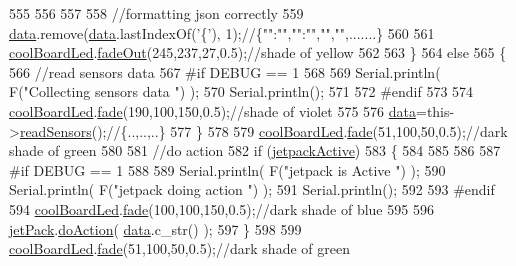 \begin{DoxyCode}
555 
556         
557 
558         \textcolor{comment}{//formatting json correctly}
559         \hyperlink{class_cool_board_a427fb753dd8575bdf821c70a5c63d695}{data}.remove(\hyperlink{class_cool_board_a427fb753dd8575bdf821c70a5c63d695}{data}.lastIndexOf(\textcolor{charliteral}{'\{'}), 1);\textcolor{comment}{//\{"":"","":"","","",.......\}}
560 
561         \hyperlink{class_cool_board_a1b1d3c684a5baa56b08486e192fd8e97}{coolBoardLed}.\hyperlink{class_cool_board_led_a93d545679237e8cc858324367149775c}{fadeOut}(245,237,27,0.5);\textcolor{comment}{//shade of yellow}
562                 
563     \}   
564     \textcolor{keywordflow}{else}
565     \{
566         \textcolor{comment}{//read sensors data}
567 \textcolor{preprocessor}{    #if DEBUG == 1}
568 
569         Serial.println( F(\textcolor{stringliteral}{"Collecting sensors data "}) );
570         Serial.println();
571 
572 \textcolor{preprocessor}{    #endif}
573 
574         \hyperlink{class_cool_board_a1b1d3c684a5baa56b08486e192fd8e97}{coolBoardLed}.\hyperlink{class_cool_board_led_af1cacbaa88db8bcf6042c1083ba41155}{fade}(190,100,150,0.5);\textcolor{comment}{//shade of violet        }
575 
576         \hyperlink{class_cool_board_a427fb753dd8575bdf821c70a5c63d695}{data}=this->\hyperlink{class_cool_board_ad03abdce2e65f520bbf2cff0f2d083cf}{readSensors}();\textcolor{comment}{//\{..,..,..\}}
577     \}
578 
579     \hyperlink{class_cool_board_a1b1d3c684a5baa56b08486e192fd8e97}{coolBoardLed}.\hyperlink{class_cool_board_led_af1cacbaa88db8bcf6042c1083ba41155}{fade}(51,100,50,0.5);\textcolor{comment}{//dark shade of green  }
580 
581     \textcolor{comment}{//do action}
582     \textcolor{keywordflow}{if} (\hyperlink{class_cool_board_a9be03a913d26e558328935ca3b59a75e}{jetpackActive})
583     \{
584     
585 
586 
587 \textcolor{preprocessor}{    #if DEBUG == 1}
588 
589         Serial.println( F(\textcolor{stringliteral}{"jetpack is Active "}) );
590         Serial.println( F(\textcolor{stringliteral}{"jetpack doing action "}) );
591         Serial.println();
592     
593 \textcolor{preprocessor}{    #endif}
594         \hyperlink{class_cool_board_a1b1d3c684a5baa56b08486e192fd8e97}{coolBoardLed}.\hyperlink{class_cool_board_led_af1cacbaa88db8bcf6042c1083ba41155}{fade}(100,100,150,0.5);\textcolor{comment}{//dark shade of blue }
595     
596         \hyperlink{class_cool_board_a30b1357881b01ccbec676856a91e48e9}{jetPack}.\hyperlink{class_jetpack_a9e703197093094b963f9ad57817495b8}{doAction}( \hyperlink{class_cool_board_a427fb753dd8575bdf821c70a5c63d695}{data}.c\_str() );
597     \}
598     
599     \hyperlink{class_cool_board_a1b1d3c684a5baa56b08486e192fd8e97}{coolBoardLed}.\hyperlink{class_cool_board_led_af1cacbaa88db8bcf6042c1083ba41155}{fade}(51,100,50,0.5);\textcolor{comment}{//dark shade of green  }

\end{DoxyCode}
